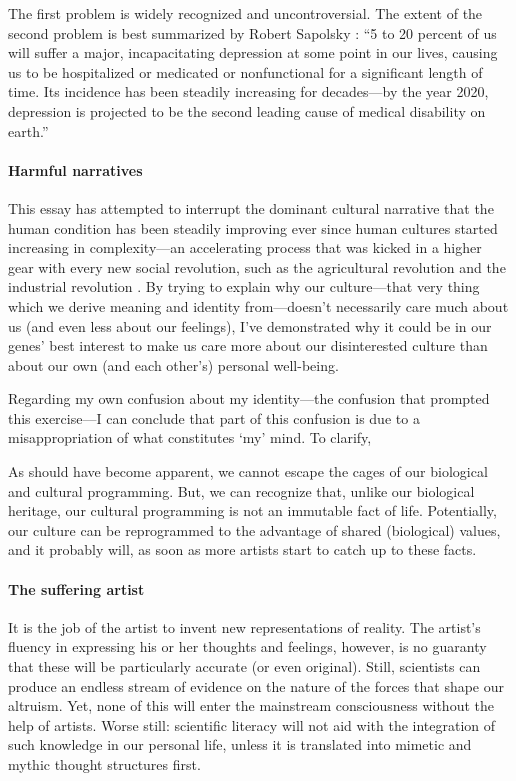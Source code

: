 \documentclass{article}
\begin{document}
The first problem is widely recognized and uncontroversial. The extent of the
second problem is best summarized by Robert Sapolsky
\citeyearpar[ch.~14]{sapolsky2004}: “5 to 20 percent of us will suffer a major,
incapacitating depression at some point in our lives, causing us to be
hospitalized or medicated or nonfunctional for a significant length of time.
Its incidence has been steadily increasing for decades---by the year 2020,
depression is projected to be the second leading cause of medical disability on
earth.”

\paragraph{Harmful narratives}

This essay has attempted to interrupt the dominant cultural narrative that the
human condition has been steadily improving ever since human cultures started
increasing in complexity---an accelerating process that was kicked in a higher
gear with every new social revolution, such as the agricultural revolution and
the industrial revolution \citep{botton2013}. By trying to explain why our
culture---that very thing which we derive meaning and identity from---doesn't
necessarily care much about us (and even less about our feelings), I've
demonstrated why it could be in our genes' best interest to make us care more
about our disinterested culture than about our own (and each other's) personal
well-being.

Regarding my own confusion about my identity---the confusion that prompted this
exercise---I can conclude that part of this confusion is due to a misappropriation
of what constitutes ‘my’ mind. To clarify, 

As should have become apparent, we cannot escape the cages of our biological
and cultural programming. But, we can recognize that, unlike our biological
heritage, our cultural programming is not an immutable fact of life.
Potentially, our culture can be reprogrammed to the advantage of shared
(biological) values, and it probably will, as soon as more artists start to
catch up to these facts.

\paragraph{The suffering artist}

It is the job of the artist to invent new representations of reality. The artist's
fluency in expressing his or her thoughts and feelings, however, is no guaranty
that these will be particularly accurate (or even original). Still, scientists
can produce an endless stream of evidence on the nature of the forces that
shape our altruism. Yet, none of this will enter the mainstream consciousness
without the help of artists. Worse still: scientific literacy will not aid with
the integration of such knowledge in our personal life, unless it is translated
into mimetic and mythic thought structures first.
\end{document}
